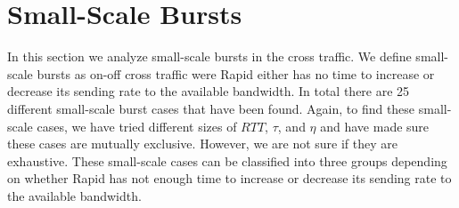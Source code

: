 \section{Small-Scale Bursts}
  In this section we analyze small-scale bursts in the cross traffic. We 
  define small-scale bursts as on-off cross traffic were Rapid either has no 
  time to increase or decrease its sending rate to the available bandwidth. In 
  total there are 25 different small-scale burst cases that have been found. 
  Again, to find these small-scale cases, we have tried different sizes of 
  $RTT$, $\tau$, and $\eta$ and have made sure these cases are mutually 
  exclusive. However, we are not sure if they are exhaustive.
  These small-scale cases can be classified into three groups depending on 
  whether Rapid has not enough time to increase or decrease its sending rate 
  to the available bandwidth.

